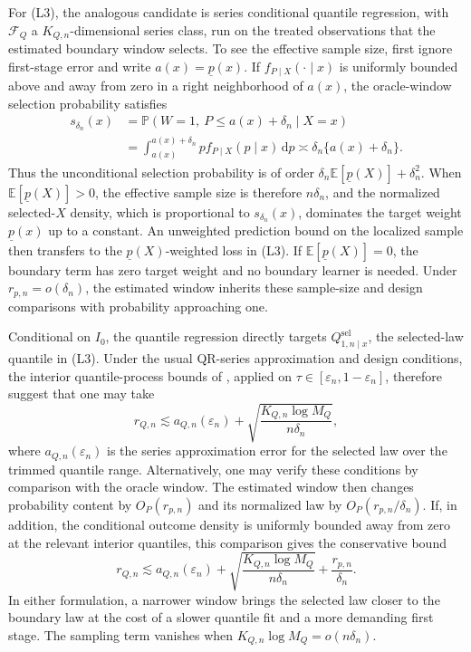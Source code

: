 \begin{remark}\label{rem:boundary_learner_construction}
For (L3), the analogous candidate is series conditional quantile regression, with $\mathcal F_Q$ a $K_{Q,n}$-dimensional series class, run on the treated observations that the estimated boundary window selects. To see the effective sample size, first ignore first-stage error and write $a(x)=\underline p(x)$. If $f_{P\mid X}(\cdot\mid x)$ is uniformly bounded above and away from zero in a right neighborhood of $a(x)$, the oracle-window selection probability satisfies
\[
\begin{aligned}
    s_{\delta_n}(x)
    &=\mathbb P\!\left(W=1,\ P\le a(x)+\delta_n\mid X=x\right)\\
    &=\int_{a(x)}^{a(x)+\delta_n}p f_{P\mid X}(p\mid x)\,\mathrm dp
      \asymp \delta_n\{a(x)+\delta_n\}.
\end{aligned}
\]
Thus the unconditional selection probability is of order $\delta_n\mathbb E[\underline p(X)]+\delta_n^2$. When $\mathbb E[\underline p(X)]>0$, the effective sample size is therefore $n\delta_n$, and the normalized selected-$X$ density, which is proportional to $s_{\delta_n}(x)$, dominates the target weight $\underline p(x)$ up to a constant. An unweighted prediction bound on the localized sample then transfers to the $\underline p(X)$-weighted loss in (L3). If $\mathbb E[\underline p(X)]=0$, the boundary term has zero target weight and no boundary learner is needed. Under $r_{p,n}=o(\delta_n)$, the estimated window inherits these sample-size and design comparisons with probability approaching one.

Conditional on $I_0$, the quantile regression directly targets $Q^{\mathrm{sel}}_{1,n\mid x}$, the selected-law quantile in (L3). Under the usual QR-series approximation and design conditions, the interior quantile-process bounds of \citet{belloni2019conditional}, applied on $\tau\in[\varepsilon_n,1-\varepsilon_n]$, therefore suggest that one may take
\[
    r_{Q,n}
    \lesssim a_{Q,n}(\varepsilon_n)
      +\sqrt{\frac{K_{Q,n}\log M_Q}{n\delta_n}},
\]
where $a_{Q,n}(\varepsilon_n)$ is the series approximation error for the selected law over the trimmed quantile range. Alternatively, one may verify these conditions by comparison with the oracle window. The estimated window then changes probability content by $O_P(r_{p,n})$ and its normalized law by $O_P(r_{p,n}/\delta_n)$. If, in addition, the conditional outcome density is uniformly bounded away from zero at the relevant interior quantiles, this comparison gives the conservative bound
\[
    r_{Q,n}
    \lesssim a_{Q,n}(\varepsilon_n)
      +\sqrt{\frac{K_{Q,n}\log M_Q}{n\delta_n}}
      +\frac{r_{p,n}}{\delta_n}.
\]
In either formulation, a narrower window brings the selected law closer to the boundary law at the cost of a slower quantile fit and a more demanding first stage. The sampling term vanishes when $K_{Q,n}\log M_Q=o(n\delta_n)$.
\end{remark}

